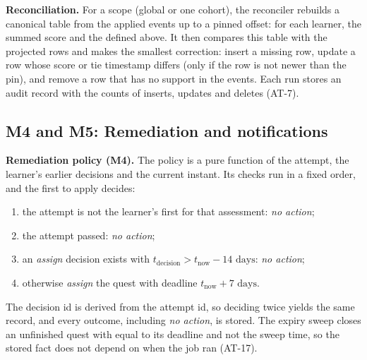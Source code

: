 \documentclass[11pt,a4paper]{article}
\renewcommand{\_}{\textunderscore\allowbreak{}}
\begin{document}
\textbf{Reconciliation.} For a scope (global or one cohort), the reconciler rebuilds a canonical table from the applied events up to a pinned offset: for each learner, the summed score and the  defined above. It then compares this table with the projected rows and makes the smallest correction: insert a missing row, update a row whose score or tie timestamp differs (only if the row is not newer than the pin), and remove a row that has no support in the events. Each run stores an audit record with the counts of inserts, updates and deletes (AT-7).

\subsection{M4 and M5: Remediation and notifications}

\textbf{Remediation policy (M4).} The policy  is a pure function of the attempt, the learner's earlier decisions and the current instant. Its checks run in a fixed order, and the first to apply decides:
\begin{enumerate}[leftmargin=2em]
    \item the attempt is not the learner's first for that assessment: \emph{no action};
    \item the attempt passed: \emph{no action};
    \item an \emph{assign} decision exists with $t_{\text{decision}} > t_{\text{now}} - 14\text{ days}$: \emph{no action};
    \item otherwise \emph{assign} the quest  with deadline $t_{\text{now}} + 7\text{ days}$.
\end{enumerate}
The decision id is derived from the attempt id, so deciding twice yields the same record, and every outcome, including \emph{no action}, is stored. The expiry sweep closes an unfinished quest with  equal to its deadline and not the sweep time, so the stored fact does not depend on when the job ran (AT-17).
\end{document}
